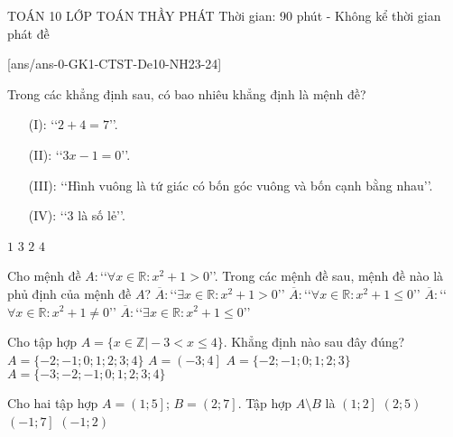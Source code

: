 \begin{name}
	{\tenchude}
	{TOÁN 10}
	{LỚP TOÁN THẦY PHÁT}
	{Thời gian: 90 phút - Không kể thời gian phát đề}
\end{name}
[ans/ans-0-GK1-CTST-De10-NH23-24]
\begin{ex}%
	Trong các khẳng định sau, có bao nhiêu khẳng định là mệnh đề?
	\begin{enumerate}
		\item[(I):] \lq\lq  $2+4=7$\rq\rq.
		\item[(II):] \lq\lq $3x-1=0$\rq\rq.
		\item[(III):] \lq\lq  Hình vuông là tứ giác có bốn góc vuông và bốn cạnh bằng nhau\rq\rq.
		\item[(IV):] \lq\lq $3$ là số lẻ\rq\rq.
	\end{enumerate}
	\choice
	{$1$}
	{\True $3$}
	{$2$}
	{$4$}
\end{ex}
\begin{ex}%
	Cho mệnh đề $A\colon$\lq\lq $\forall x \in \mathbb{R}\colon x^2+1>0$\rq\rq. Trong các mệnh đề sau, mệnh đề nào là phủ định của mệnh đề $A$?
	\choice
	{$\overline{A}\colon$\lq\lq $\exists x\in \mathbb{R}\colon x^2+1>0$\rq\rq}
	{$\overline{A}\colon$\lq\lq $\forall x\in \mathbb{R}\colon x^2+1 \leq 0$\rq\rq}
	{$\overline{A}\colon$\lq\lq $\forall x\in \mathbb{R}\colon x^2+1 \neq 0$\rq\rq}
	{\True $\overline{A}\colon $\lq\lq $\exists x\in \mathbb{R}\colon x^2+1 \leq 0$\rq\rq}
\end{ex}
\begin{ex}%
	Cho tập hợp $A=\{x\in \mathbb{Z} \Big| -3<x \leq 4\}$. Khẳng định nào sau đây đúng?
	\choice
	{\True $A=\{-2;-1;0;1;2;3;4\}$}
	{$A=\left(-3;4\right]$}
	{$A=\{-2;-1;0;1;2;3\}$}
	{$A=\{-3;-2;-1;0;1;2;3;4\}$}
\end{ex}
\begin{ex}%
	Cho hai tập hợp $A=\left(1;5\right]$; $B=\left(2;7\right]$. Tập hợp $A \setminus B$ là
	\choice
	{\True $\left(1;2\right]$}
	{$\left(2;5\right)$}
	{$\left(-1;7\right]$}
	{$\left(-1;2\right)$}
	\loigiai{
		Ta có $A \setminus B=\left(1;2\right]$. 	
	}
\end{ex}
